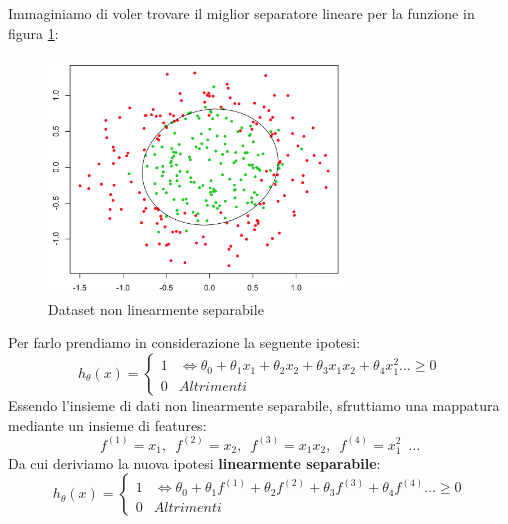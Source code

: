 \begin{esempio}
  Immaginiamo di voler trovare il miglior separatore lineare per la funzione in figura \ref{NonLinearFunction}:
  \begin{figure}[H]
    \centering
    \includegraphics[width=0.7\textwidth]{img/nonLinearFunction.png}
    \caption{Dataset non linearmente separabile}
    \label{NonLinearFunction}
\end{figure}
Per farlo prendiamo in considerazione la seguente ipotesi:
\[h_\theta(x) =
    \begin{cases}
      1& \iff \theta_0 + \theta_1x_1 + \theta_2x_2 + 
      \theta_3x_1x_2 + \theta_4x^2_1 \dots \geq 0 \\
      0& Altrimenti
    \end{cases}
  \]
  Essendo l'insieme di dati non linearmente separabile, sfruttiamo una mappatura mediante un insieme di features:
  \[f^{(1)} = x_1,\,\,\,f^{(2)} = x_2,\,\,\,f^{(3)} = x_1x_2, \,\,\, f^{(4)} = x_1^2 \,\,\,\dots\]
  Da cui deriviamo la nuova ipotesi \textbf{linearmente separabile}:
  \[h_\theta(x) =
    \begin{cases}
      1& \iff \theta_0 + \theta_1f^{(1)} + \theta_2f^{(2)} + 
      \theta_3f^{(3)} + \theta_4f^{(4)} \dots \geq 0 \\
      0& Altrimenti
    \end{cases}
  \]
\end{esempio}
